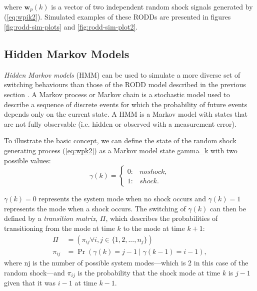 where $\mathbf{w}_p(k)$ is a vector of two independent random shock signals generated by (\ref{eq:wpik2}). Simulated examples of these RODDs are presented in figures \ref{fig:rodd-sim-plots} and \ref{fig:rodd-sim-plot2}.

\subsection{Hidden Markov Models}

\textit{Hidden Markov models} (\gls{HMM}) can be used to simulate a more diverse set of switching behaviours than those of the RODD model described in the previous section \citep{wong_realistic_2009}. A Markov process or Markov chain is a stochastic model used to describe a sequence of discrete events for which the probability of future events depends only on the current state. A HMM is a Markov model with states that are not fully observable (i.e. hidden or observed with a measurement error).

To illustrate the basic concept, we can define the state of the random shock generating process (\ref{eq:wpk2}) as a Markov model state \gls{gamma_k} with two possible values:
\begin{equation} \label{eq:gamma-k}
	\gamma(k) = 
	\begin{cases*}
		0: & no shock, \\
		1: & shock.
	\end{cases*}
\end{equation}

 
$\gamma(k)=0$ represents the system mode when no shock occurs and $\gamma(k)=1$ represents the mode when a shock occurs. The switching of $\gamma(k)$ can then be defined by a \textit{transition matrix}, $\Pi$, which describes the probabilities of transitioning from the mode at time $k$ to the mode at time $k+1$:
\begin{equation} \label{eq:Pi}
	\begin{aligned}
	\Pi &= \left(\pi_{ij} \forall i,j\in \{1,2,...,n_j\}\right) \\
	\pi_{ij} &= \Pr\left( \gamma(k)=j-1 \mid \gamma(k-1)=i-1 \right),
	\end{aligned}
\end{equation}
where \gls{nj} is the number of possible system modes---which is 2 in this case of the random shock---and $\pi_{ij}$ is the probability that the shock mode at time $k$ is $j-1$ given that it was $i-1$ at time $k-1$.

